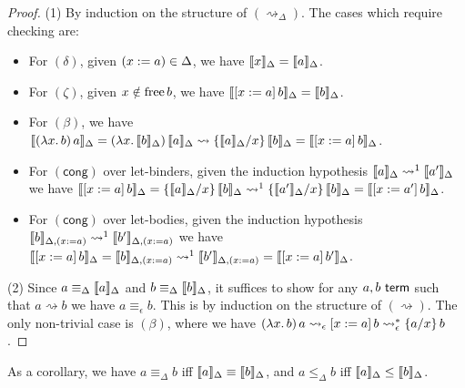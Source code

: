 \documentclass[twoside]{report}
\begin{document}
\begin{proof}
    (1) By induction on the structure of $(\rightsquigarrow_\Delta)$. The cases which require checking are:

    \begin{itemize}[noitemsep]
        \item For $(\delta)$, given $(x \defeq a) \in \Delta$, we have $\inter{x}_\Delta = \inter{a}_\Delta$.

        \item For $(\zeta)$, given $x \notin \free b$, we have $\inter{\llet x a b}_\Delta = \inter{b}_\Delta$.

        \item For $(\beta)$, we have $\inter{\app {(\lam x b)} a}_\Delta = \app {(\lam x {\inter{b}_\Delta})} {\inter{a}_\Delta} \rightsquigarrow \subst x {\inter{a}_\Delta} {\inter{b}_\Delta} = \inter{\llet x a b}_\Delta$.

        \item For $(\mathsf{cong})$ over let-binders, given the induction hypothesis $\inter{a}_\Delta \rightsquigarrow^1 \inter{a'}_\Delta$ we have $\inter{\llet x a b}_\Delta = \subst x {\inter{a}_\Delta} {\inter{b}_\Delta} \rightsquigarrow^1 \subst x {\inter{a'}_\Delta} {\inter{b}_\Delta} = \inter{\llet x {a'} b}_\Delta$.

        \item For $(\mathsf{cong})$ over let-bodies, given the induction hypothesis $\inter{b}_{\Delta, (x \defeq a)} \rightsquigarrow^1 \inter{b'}_{\Delta, (x \defeq a)}$ we have $\inter{\llet x a b}_\Delta = \inter{b}_{\Delta, (x \defeq a)} \rightsquigarrow^1 \inter{b'}_{\Delta, (x \defeq a)} = \inter{\llet x a {b'}}_\Delta$.
    \end{itemize}

    (2) Since $a \equiv_\Delta \inter{a}_\Delta$ and $b \equiv_\Delta \inter{b}_\Delta$, it suffices to show for any $a, b \termo$ such that $a \rightsquigarrow b$ we have $a \equiv_\epsilon b$. This is by induction on the structure of $(\rightsquigarrow)$. The only non-trivial case is $(\beta)$, where we have $\app {(\lam x b)} a \rightsquigarrow_\epsilon \llet x a b \rightsquigarrow_\epsilon^\ast \subst x a b$.
\end{proof}

As a corollary, we have $a \equiv_\Delta b$ iff $\inter{a}_\Delta \equiv \inter{b}_\Delta$, and $a \leq_\Delta b$ iff $\inter{a}_\Delta \leq \inter{b}_\Delta$.
\end{document}
